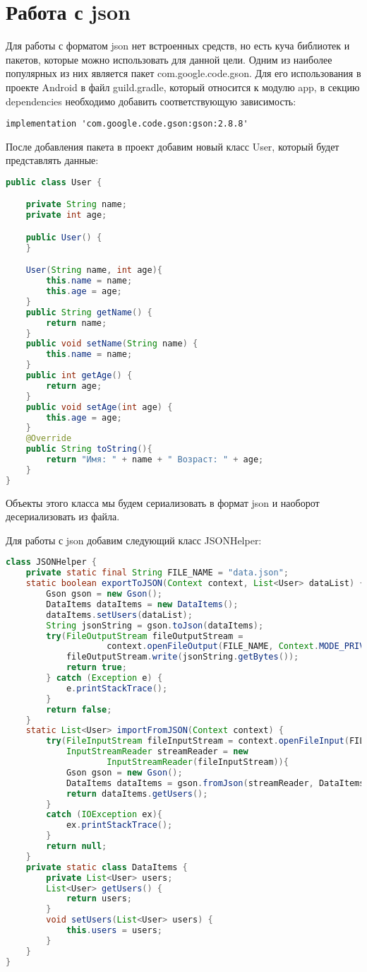 \section{Работа с json}
Для работы с форматом json нет встроенных средств, но есть куча библиотек
и пакетов, которые можно использовать для данной цели. Одним из наиболее
популярных из них является пакет com.google.code.gson.
Для его использования в проекте Android в файл guild.gradle, который
относится к модулю app, в секцию dependencies необходимо добавить
соответствующую зависимость:

\begin{verbatim}
implementation 'com.google.code.gson:gson:2.8.8'
\end{verbatim}

После добавления пакета в проект добавим новый класс User, который будет
представлять данные:

\begin{lstlisting}[language=Java
	, label=lst:
	]
public class User {

	private String name;
	private int age;

	public User() {
	}

	User(String name, int age){
		this.name = name;
		this.age = age;
	}
	public String getName() {
		return name;
	}
	public void setName(String name) {
		this.name = name;
	}
	public int getAge() {
		return age;
	}
	public void setAge(int age) {
		this.age = age;
	}
	@Override
	public String toString(){
		return "Имя: " + name + " Возраст: " + age;
	}
}
\end{lstlisting}

Объекты этого класса мы будем сериализовать в формат json и наоборот
десериализовать из файла.\par
Для работы с json добавим следующий класс JSONHelper:

\begin{lstlisting}[language=Java
	, label=lst:
	]
class JSONHelper {
	private static final String FILE_NAME = "data.json";
	static boolean exportToJSON(Context context, List<User> dataList) {
		Gson gson = new Gson();
		DataItems dataItems = new DataItems();
		dataItems.setUsers(dataList);
		String jsonString = gson.toJson(dataItems);
		try(FileOutputStream fileOutputStream =
					context.openFileOutput(FILE_NAME, Context.MODE_PRIVATE)) {
			fileOutputStream.write(jsonString.getBytes());
			return true;
		} catch (Exception e) {
			e.printStackTrace();
		}
		return false;
	}
	static List<User> importFromJSON(Context context) {
		try(FileInputStream fileInputStream = context.openFileInput(FILE_NAME);
			InputStreamReader streamReader = new
					InputStreamReader(fileInputStream)){
			Gson gson = new Gson();
			DataItems dataItems = gson.fromJson(streamReader, DataItems.class);
			return dataItems.getUsers();
		}
		catch (IOException ex){
			ex.printStackTrace();
		}
		return null;
	}
	private static class DataItems {
		private List<User> users;
		List<User> getUsers() {
			return users;
		}
		void setUsers(List<User> users) {
			this.users = users;
		}
	}
}
\end{lstlisting}

